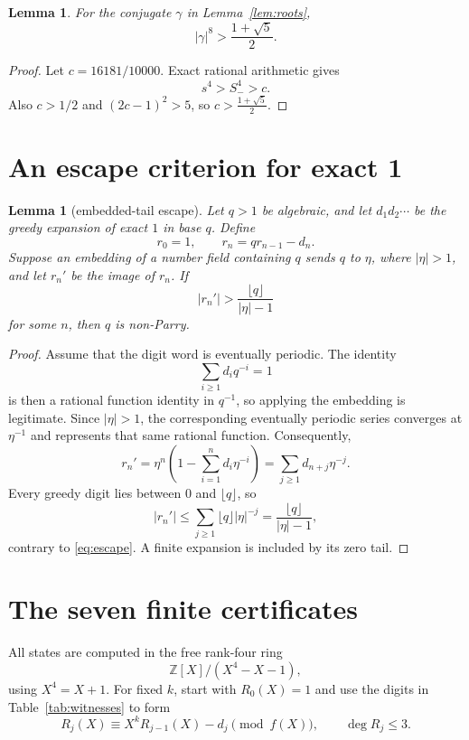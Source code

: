\documentclass[11pt]{amsart}
\newtheorem{lemma}[theorem]{Lemma}
\theoremstyle{definition}
\newcommand{\Z}{\mathbb{Z}}
\newcommand{\phig}{\frac{1+\sqrt5}{2}}
\begin{document}
\begin{lemma}\label{lem:cutoff}
For the conjugate $\gamma$ in Lemma~\ref{lem:roots},
\[
|\gamma|^8>\phig.
\]
\end{lemma}

\begin{proof}
Let $c=16181/10000$.  Exact rational arithmetic gives
\[
s^4>S_-^4>c.
\]
Also $c>1/2$ and $(2c-1)^2>5$, so $c>\phig$.
\end{proof}

\section{An escape criterion for exact 1}

\begin{lemma}[embedded-tail escape]\label{lem:escape}
Let $q>1$ be algebraic, and let $d_1d_2\cdots$ be the greedy expansion of
exact $1$ in base $q$.  Define
\[
r_0=1,\qquad r_n=qr_{n-1}-d_n.
\]
Suppose an embedding of a number field containing $q$ sends $q$ to
$\eta$, where $|\eta|>1$, and let $r_n'$ be the image of $r_n$.  If
\begin{equation}\label{eq:escape}
|r_n'|>\frac{\lfloor q\rfloor}{|\eta|-1}
\end{equation}
for some $n$, then $q$ is non-Parry.
\end{lemma}

\begin{proof}
Assume that the digit word is eventually periodic.  The identity
\[
\sum_{i\geq1}d_iq^{-i}=1
\]
is then a rational function identity in $q^{-1}$, so applying the embedding is
legitimate.  Since $|\eta|>1$, the corresponding
eventually periodic series converges at $\eta^{-1}$ and represents that same
rational function.  Consequently,
\[
r_n'=\eta^n\left(1-\sum_{i=1}^n d_i\eta^{-i}\right)
     =\sum_{j\geq1}d_{n+j}\eta^{-j}.
\]
Every greedy digit lies between $0$ and $\lfloor q\rfloor$, so
\[
|r_n'|\leq \sum_{j\geq1}\lfloor q\rfloor |\eta|^{-j}
=\frac{\lfloor q\rfloor}{|\eta|-1},
\]
contrary to \eqref{eq:escape}.  A finite expansion is included by its zero
tail.
\end{proof}

\section{The seven finite certificates}

All states are computed in the free rank-four ring
\[
\Z[X]/(X^4-X-1),
\]
using $X^4=X+1$.  For fixed $k$, start with $R_0(X)=1$ and use the digits in
Table~\ref{tab:witnesses} to form
\begin{equation}\label{eq:recurrence}
R_j(X)\equiv X^kR_{j-1}(X)-d_j \pmod{f(X)},
\qquad \deg R_j\leq 3.
\end{equation}
\end{document}
